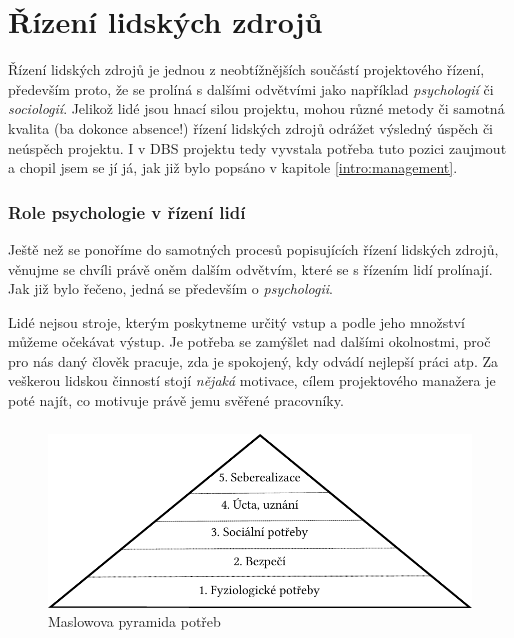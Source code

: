 \chapter{Řízení lidských zdrojů} \label{DBSmanagement}

Řízení lidských zdrojů je jednou z neobtížnějších součástí projektového řízení, především proto, že se prolíná s dalšími odvětvími jako například \emph{psychologií} či \emph{sociologií}. Jelikož lidé jsou hnací silou projektu, mohou různé metody či samotná kvalita (ba dokonce absence!) řízení lidských zdrojů odrážet výsledný úspěch či neúspěch projektu. I v DBS projektu tedy vyvstala potřeba tuto pozici zaujmout a chopil jsem se jí já, jak již bylo popsáno v kapitole \ref{intro:management}.

\subsection{Role psychologie v řízení lidí}
Ještě než se ponoříme do samotných procesů popisujících řízení lidských zdrojů, věnujme se chvíli právě oněm dalším odvětvím, které se s řízením lidí prolínají. Jak již bylo řečeno, jedná se především o \emph{psychologii}.

Lidé nejsou stroje, kterým poskytneme určitý vstup a podle jeho množství můžeme očekávat výstup. Je potřeba se zamýšlet nad dalšími okolnostmi, proč pro nás daný člověk pracuje, zda je spokojený, kdy odvádí nejlepší práci atp. Za veškerou lidskou činností stojí \emph{nějaká} motivace, cílem projektového manažera je poté najít, co motivuje právě jemu svěřené pracovníky.

\paragraph{}
\begin{figure}[h]
\includegraphics[width=\textwidth]{../pdf/maslow.pdf}
\caption{Maslowova pyramida potřeb} \label{picture:maslow}
\end{figure}

